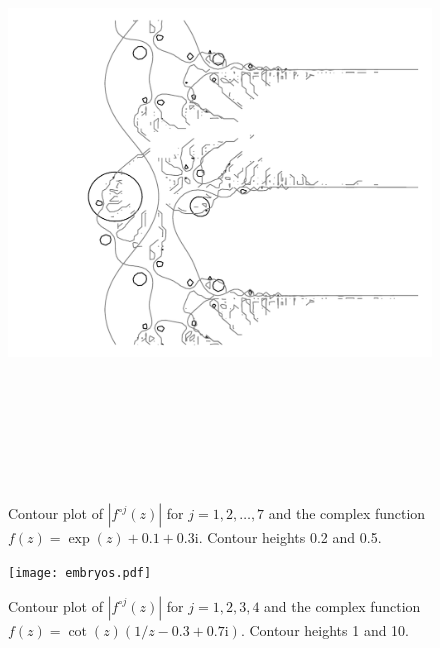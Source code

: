 \documentclass[12pt, a4paper]{amsart}
\newcommand{\mi}{\text{i}}  %
\begin{document}
\begin{figure}[!ht] 
\includegraphics[height=160mm, angle=-90]{landscape.pdf}\\[10mm]
\caption{
Contour plot of $|f^{\circ j}(z)|$ for $j=1, 2, \ldots, 7$ and the complex function $f(z) = \exp(z) + 0.1 + 0.3\mi$.
Contour heights 0.2 and 0.5.
}
\end{figure}
\pagebreak
\begin{figure}[!ht] 
\texttt{[image: embryos.pdf]}\\[10mm]
\caption{
Contour plot of $|f^{\circ j}(z)|$ for $j=1, 2, 3, 4$ and the complex function $f(z) = \cot(z)(1/z - 0.3 + 0.7\mi)$.
Contour heights 1 and 10.
}
\end{figure}
\pagebreak
\end{document}
